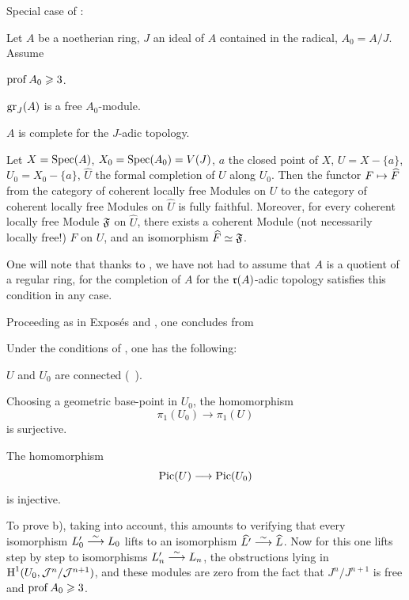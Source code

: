 Special case of :

\begin{corollary} \label{XII.4.5}
Let $A$ be a noetherian ring, $J$ an ideal of $A$ contained in the radical, $A_0=A/J$. Assume
\begin{enumeratei}
\item
$\operatorname{prof} A_0\geqslant 3$.
\item
$\operatorname{gr}_J(A)$ is a free $A_0$-module.
\item
$A$ is complete for the $J$-adic topology.
\end{enumeratei}

Let $X=\operatorname{Spec}(A)$, $X_0=\operatorname{Spec}(A_0)=V(J)$, $a$ the closed point of $X$, $U=X-\{a\}$, $U_0=X_0-\{a\}$, $\widehat{U}$ the formal completion of $U$ along $U_0$. Then the functor $F\mto \widehat{F}$ from the category of coherent locally free Modules on $U$ to the category of coherent locally free Modules on $\widehat{U}$ is fully faithful. Moreover, for every coherent locally free Module $\mathfrak{F}$ on $\widehat{U}$, there exists a coherent Module (not necessarily locally free!) $F$ on $U$, and an isomorphism $\widehat{F}\simeq\mathfrak{F}$.
\end{corollary}

One will note that thanks to , we have not had to assume that $A$ is a quotient of a regular ring, for the completion of $A$ for the $\mathfrak{r}(A)$-adic topology satisfies this condition in any case.

Proceeding as in Expos\'es  and , one concludes from 

\begin{corollary} \label{XII.4.6}
Under the conditions of , one has the following:
\begin{enumeratea}
\item
$U$ and $U_0$ are connected (~).

Choosing a geometric base-point in $U_0$, the homomorphism
\[
\pi_1(U_0)\to \pi_1(U)
\]
is surjective.
\item
The homomorphism
\[
\Pic(U)\to \Pic(U_0)
\]
is injective.
\end{enumeratea}
\end{corollary}

To prove b), taking  into account, this amounts to verifying that every isomorphism $L_0'\overset{\sim}{\longrightarrow} L_0$ lifts to an isomorphism $\widehat{L'}\overset{\sim}{\longrightarrow} \widehat{L}$. Now for this one lifts step by step to isomorphisms $L_n'\overset{\sim}{\longrightarrow} L_n$, the obstructions lying in $\operatorname{H}^1(U_0, {\mathcal J}^n/{\mathcal J}^{n+1})$, and these modules are zero from the fact that $J^n/J^{n+1}$ is free and $\operatorname{prof} A_0\geqslant 3$.

